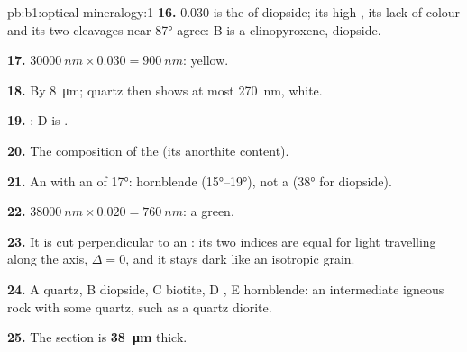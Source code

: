 \begin{solution}{pb:b1:optical-mineralogy:1}
\textbf{16.} $0.030$ is the  of diopside; its high , its
lack of colour and its two cleavages near \ang{87} agree: B is a
clinopyroxene, diopside.

\textbf{17.} $\qty{30000}{nm}\times0.030 = \qty{900}{nm}$:  yellow.

\textbf{18.} By \qty{8}{\micro m}; quartz then shows at most \qty{270}{nm},
 white.

\textbf{19.} : D is .

\textbf{20.} The composition of the  (its anorthite content).

\textbf{21.} An  with an  of \ang{17}: hornblende
(\ang{15}--\ang{19}), not a  (\ang{38} for diopside).

\textbf{22.} $\qty{38000}{nm}\times0.020 = \qty{760}{nm}$: a 
green.

\textbf{23.} It is cut perpendicular to an : its two indices are
equal for light travelling along the axis, $\Delta = 0$, and it stays dark like
an isotropic grain.

\textbf{24.} A quartz, B diopside, C biotite, D , E hornblende: an
intermediate igneous rock with some quartz, such as a quartz diorite.

\textbf{25.} The section is \textbf{\qty[text-series-to-math=true]{38}{\micro m}} thick.
\end{solution}
